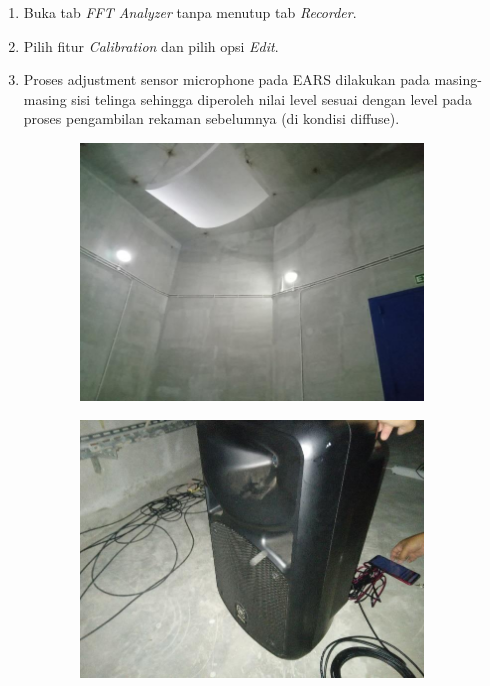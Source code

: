 \documentclass{article}
\begin{document}
\begin{enumerate}
\begin{enumerate}
			\item Buka tab \textit{FFT Analyzer} tanpa menutup tab \textit{Recorder}.
			
			\item Pilih fitur \textit{Calibration} dan pilih opsi \textit{Edit}.
			
			\item Proses adjustment sensor microphone pada EARS dilakukan pada masing-masing sisi telinga sehingga diperoleh nilai level sesuai dengan level pada proses pengambilan
			rekaman sebelumnya (di kondisi diffuse).
		\end{enumerate}
	\end{enumerate}

	\begin{figure}[H]
		\centering
		\begin{subfigure}[]{.45\textwidth}
			\includegraphics[width=\textwidth]{images/dengung/ruang_dengung}
			\caption{}
		\end{subfigure}
		\begin{subfigure}[]{.45\textwidth}
			\includegraphics[width=\textwidth]{images/dengung/speaker}

\end{subfigure}
\end{figure}
\end{document}
